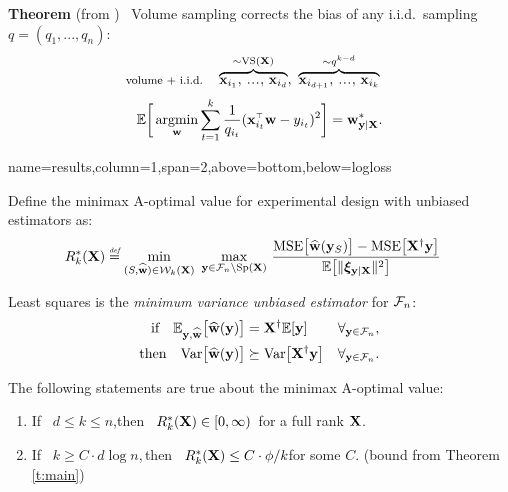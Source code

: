 \documentclass[portrait,paperwidth=24in,paperheight=36in,fontscale=0.4]{baposter} %
\begin{document}
\begin{poster}
{\textbf{Theorem} (from \cite{correcting-bias}) \
Volume sampling corrects the bias of any i.i.d.~sampling $q=(q_1,...,q_n)$:
\begin{align*}
\text{\footnotesize volume + i.i.d.}\quad
  &\overbrace{\x_{i_1},\,\mydots,\,\x_{i_d}}^{\sim\Vol(\X)},\
  \overbrace{\x_{i_{d+1}},\,\mydots,\,\x_{i_{k}}}^{\sim q^{k-d}}
\end{align*}
\vspace{-8mm}
\begin{align*}
  \E\bigg[\argmin_\w\sum_{t=1}^k\frac1{q_{i_t}}(\x_{i_t}^\top\w-y_{i_t})^2\bigg]
  = \w_{\y|\X}^*.
\end{align*}
}




{name=results,column=1,span=2,above=bottom,below=logloss}{
    \begin{definition}
Define the minimax A-optimal value for experimental design with
unbiased estimators as:
\begin{align*}
R_k^*(\X)&\defeq 
  \min_{(S,\wbh)\in\Wc_k(\X)}\ \max_{\y\in\Fc_n\backslash\mathrm{Sp}(\X)}\,\frac{\mathrm{MSE}\big[\wbh(\y_S)\big]-
     \mathrm{MSE}\big[\X^\dagger\y\big]
  }{\E\big[\|\xib_{\y|\X}\|^2\big]}
\end{align*}
\end{definition}
\begin{proposition} Least squares is the \textit{minimum
  variance unbiased estimator} for $\mathcal{F}_n$:
\begin{align*}
  \text{if}\quad  \mathbb E_{\mathbf y,\widehat{\mathbf w}}\big[\widehat{\mathbf w}(\mathbf y)\big]
  &=\mathbf X^\dagger\mathbb E[\mathbf y]\quad\quad\,\forall_{\mathbf y\in\mathcal{F}_n},
\\ \text{then}\quad
  \mathrm{Var}\big[\widehat{\mathbf w}(\mathbf y)\big]&\succeq\mathrm{Var}\big[\mathbf X^\dagger\mathbf y\big]\quad \forall_{\mathbf y\in\mathcal{F}_n}.
\end{align*}
\end{proposition}
\begin{theorem}
  The following statements are true about the minimax A-optimal value:
\begin{enumerate}
\item If \ $d\leq k\leq n$,\qquad\quad then \
  $R_k^*(\mathbf X)\in[0,\infty)$\quad \ for a full rank $\mathbf X$.
\item If \ $k\geq C\cdot d\log n$,\quad \,then \ $R_k^*(\mathbf X)\leq
  C\cdot\phi/k$\quad\quad\quad\!for some $C$.
  \hfill(bound from Theorem \ref{t:main})

\end{enumerate}
\end{theorem}}
\end{poster}
\end{document}
